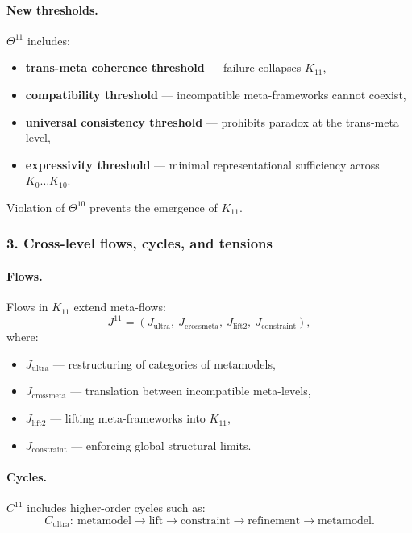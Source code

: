 \paragraph{New thresholds.}
$\Theta^{11}$ includes:
\begin{itemize}
  \item \textbf{trans-meta coherence threshold} — failure collapses $K_{11}$,
  \item \textbf{compatibility threshold} — incompatible meta-frameworks
        cannot coexist,
  \item \textbf{universal consistency threshold} — prohibits paradox at the
        trans-meta level,
  \item \textbf{expressivity threshold} — minimal representational sufficiency
        across $K_0\dots K_{10}$.
\end{itemize}

Violation of $\Theta^{10}$ prevents the emergence of $K_{11}$.

\subsubsection{3. Cross-level flows, cycles, and tensions}

\paragraph{Flows.}
Flows in $K_{11}$ extend meta-flows:
\[
J^{11} = (J_{\mathrm{ultra}},\ J_{\mathrm{crossmeta}},\
         J_{\mathrm{lift2}},\ J_{\mathrm{constraint}}),
\]
where:
\begin{itemize}
  \item $J_{\mathrm{ultra}}$ — restructuring of categories of metamodels,
  \item $J_{\mathrm{crossmeta}}$ — translation between incompatible meta-levels,
  \item $J_{\mathrm{lift2}}$ — lifting meta-frameworks into $K_{11}$,
  \item $J_{\mathrm{constraint}}$ — enforcing global structural limits.
\end{itemize}

\paragraph{Cycles.}
$C^{11}$ includes higher-order cycles such as:
\[
C_{\mathrm{ultra}}:\ 
\text{metamodel} \rightarrow \text{lift} \rightarrow \text{constraint}
\rightarrow \text{refinement} \rightarrow \text{metamodel}.
\]

